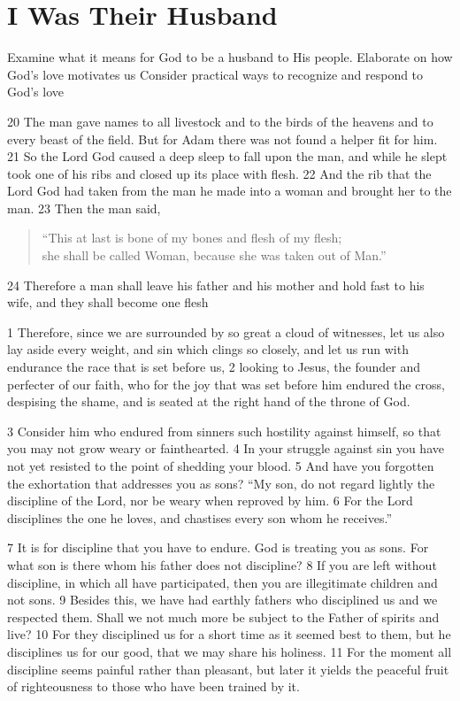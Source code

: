\chapter{I Was Their Husband}

\begin{goals}
\goal Examine what it means for God to be a husband to His people.
\goal Elaborate on how God's love motivates us
\goal Consider practical ways to recognize and respond to God's love
\end{goals}

\begin{bible}

20 The man gave names to all livestock and to the birds of the heavens and to every beast of the field. But for Adam there was not found a helper fit for him. 21 So the Lord God caused a deep sleep to fall upon the man, and while he slept took one of his ribs and closed up its place with flesh. 22 And the rib that the Lord God had taken from the man he made into a woman and brought her to the man. 23 Then the man said,
\begin{quote}
``This at last is bone of my bones and flesh of my flesh;\\
she shall be called Woman, because she was taken out of Man.”
\end{quote}
24 Therefore a man shall leave his father and his mother and hold fast to his wife, and they shall become one flesh

1 Therefore, since we are surrounded by so great a cloud of witnesses, let us also lay aside every weight, and sin which clings so closely, and let us run with endurance the race that is set before us, 2 looking to Jesus, the founder and perfecter of our faith, who for the joy that was set before him endured the cross, despising the shame, and is seated at the right hand of the throne of God.

3 Consider him who endured from sinners such hostility against himself, so that you may not grow weary or fainthearted. 4 In your struggle against sin you have not yet resisted to the point of shedding your blood. 5 And have you forgotten the exhortation that addresses you as sons?  ``My son, do not regard lightly the discipline of the Lord, nor be weary when reproved by him. 6 For the Lord disciplines the one he loves, and chastises every son whom he receives.''

7 It is for discipline that you have to endure. God is treating you as sons. For what son is there whom his father does not discipline? 8 If you are left without discipline, in which all have participated, then you are illegitimate children and not sons. 9 Besides this, we have had earthly fathers who disciplined us and we respected them. Shall we not much more be subject to the Father of spirits and live? 10 For they disciplined us for a short time as it seemed best to them, but he disciplines us for our good, that we may share his holiness. 11 For the moment all discipline seems painful rather than pleasant, but later it yields the peaceful fruit of righteousness to those who have been trained by it.


\end{bible}
